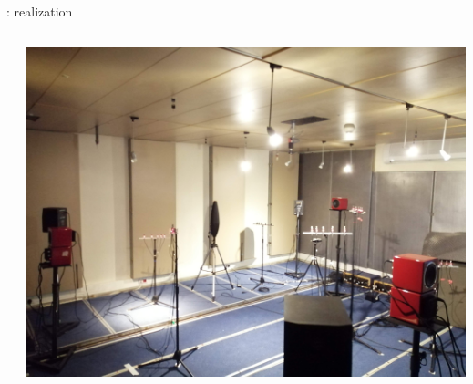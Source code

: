 \begin{frame}[t]{\dechorate: realization}
{\begin{columns}[T,onlytextwidth]
\begin{column}{0.3\textwidth}
            \end{column}\hfill
            \begin{column}{0.3\textwidth}
                \includegraphics[width=\textwidth]{figures/dechorate/panels}
            \end{column}
        \end{columns}
    }

\end{frame}

